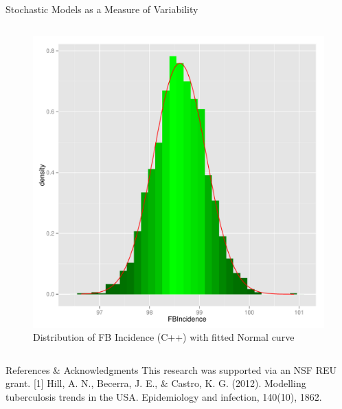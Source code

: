 \documentclass[final]{beamer}
\begin{document}
\begin{frame}
\begin{columns}[T]
\begin{column}{.3\textwidth}
\begin{block}{Stochastic Models as a Measure of Variability}
\begin{columns}
\begin{column}{.45\textwidth}
\begin{figure}[h]
\begin{center}
                \includegraphics[width=\textwidth]{IN1dist}
              \end{center}
              \caption{Distribution of FB Incidence (C++) with fitted Normal curve}
              \label{fig:IN1dist}
            \end{figure}
          \end{column}
        \end{columns}
      \end{block}
      
      \vspace{.9em}
      \begin{block}{References \& Acknowledgments}
        This research was supported via an NSF REU grant. 
        \small{[1] Hill, A. N., Becerra, J. E., \& Castro, K. G. (2012). Modelling
          tuberculosis trends in the USA. Epidemiology and infection, 140(10),
          1862.}
      \end{block}
      
    \end{column}
  \end{columns}
\end{frame}
\end{document}
